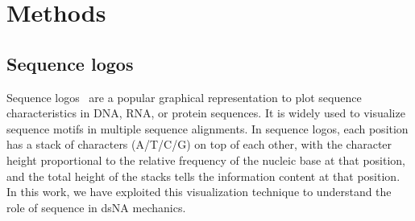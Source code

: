 
\section{Methods}
\subsection{Sequence logos}\label{c1:sec_seq_logo}
Sequence logos~\cite{schneider1990sequence} are a popular graphical representation to plot sequence characteristics in DNA, RNA, or protein sequences. 
It is widely used to visualize sequence motifs in multiple sequence alignments. 
In sequence logos, each position has a stack of characters (A/T/C/G) on top of each other, with the character height proportional to the relative frequency of the nucleic base at that position, and the total height of the stacks tells the information content at that position. 
In this work, we have exploited this visualization technique to understand the role of sequence in dsNA mechanics.

